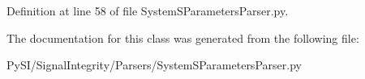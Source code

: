 Definition at line 58 of file System\+S\+Parameters\+Parser.\+py.



The documentation for this class was generated from the following file\+:\begin{DoxyCompactItemize}
\item 
Py\+S\+I/\+Signal\+Integrity/\+Parsers/System\+S\+Parameters\+Parser.\+py\end{DoxyCompactItemize}
